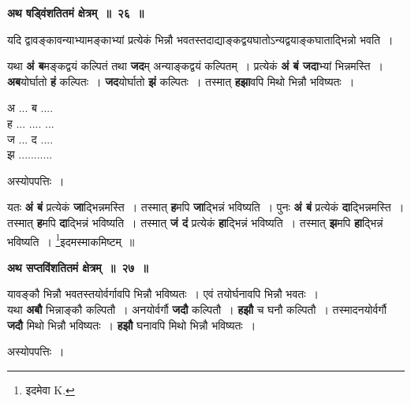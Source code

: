 \documentclass[11pt, openany]{book}
\begin{document}
\begin{center}
\textbf{\large अथ षड्विंशतितमं क्षेत्रम्~॥~२६~॥}
\end{center}
 
 {\ab यदि द्वावङ्कावन्याभ्यामङ्काभ्यां प्रत्येकं भिन्नौ भवतस्तदाद्याङ्कद्वयघातोऽन्यद्वयाङ्कघाताद्भिन्नो भवति~। }

\newpage
\begin{flushleft}
\begin{minipage}[t]{0.65\textwidth}
\hspace{4mm} यथा \textbf{अं ब}मङ्कद्वयं कल्पितं तथा \textbf{जद}म् अन्याङ्कद्वयं कल्पितम्~। प्रत्येकं \textbf{अं बं जदा}भ्यां भिन्नमस्ति~। \textbf{अब}योर्घातो \textbf{हं} कल्पितः~। \textbf{जद}योर्घातो \textbf{झं} कल्पितः~। तस्मात् \textbf{हझा}वपि मिथो भिन्नौ भविष्यतः~।
\end{minipage} 
\hfill
\begin{minipage}[t]{0.25\textwidth}
अ ... ब ....\\
ह ... .... ...\\
ज ... द ....\\
झ ...........
\end{minipage}
\end{flushleft}

\begin{center}
अस्योपपत्तिः~।
 \end{center}
 
 यतः \textbf{अं बं} प्रत्येकं \textbf{जा}द्भिन्नमस्ति~। तस्मात् \textbf{ह}मपि \textbf{जा}द्भिन्नं भविष्यति~। पुनः \textbf{अं बं} प्रत्येकं \textbf{दा}द्भिन्नमस्ति~। तस्मात् \textbf{ह}मपि \textbf{दा}द्भिन्नं भविष्यति~। तस्मात् \textbf{जं दं} प्रत्येकं \textbf{हा}द्भिन्नं भविष्यति~। तस्मात् \textbf{झ}मपि \textbf{हा}द्भिन्नं भविष्यति~। \renewcommand{\thefootnote}{१}\footnote{इदमेवा {\en K.}}इदमस्माकमिष्टम्~॥ 
\vspace{2mm}
 
\begin{center}
\textbf{\large अथ सप्तविंशतितमं क्षेत्रम्~॥~२७~॥}
\end{center}

{\ab यावङ्कौ भिन्नौ भवतस्तयोर्वर्गावपि भिन्नौ भविष्यतः~। एवं तयोर्घनावपि भिन्नौ भवतः~। }\\

 यथा \textbf{अबौ} भिन्नाङ्कौ कल्पितौ~। अनयोर्वर्गौ \textbf{जदौ} कल्पितौ~। \textbf{हझौ} च घनौ कल्पितौ~। तस्मादनयोर्वर्गौ \textbf{जदौ} मिथो भिन्नौ भविष्यतः~। \textbf{हझौ} घनावपि मिथो भिन्नौ भविष्यतः~।

\begin{center}
अस्योपपत्तिः~।
\end{center}
\end{document}
